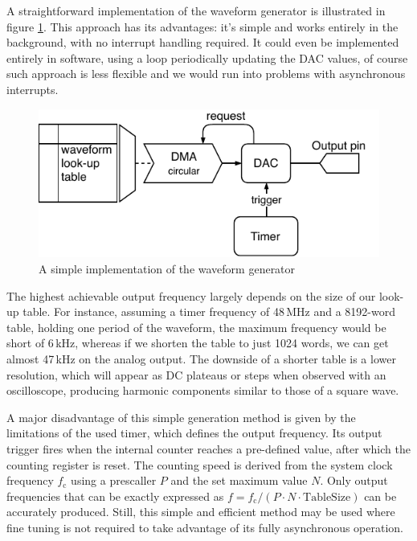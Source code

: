 A straightforward implementation of the waveform generator is illustrated in figure \ref{fig:wavegen-naive}. This approach has its advantages: it's simple and works entirely in the background, with no interrupt handling required. It could even be implemented entirely in software, using a loop periodically updating the DAC values, of course such approach is less flexible and we would run into problems with asynchronous interrupts.

\begin{figure}
	\centering
	\includegraphics[scale=1] {img/wavegen-naive.pdf}
	\caption{\label{fig:wavegen-naive}A simple implementation of the waveform generator}
\end{figure}

The highest achievable output frequency largely depends on the size of our look-up table. For instance, assuming a timer frequency of 48\,MHz and a 8192-word table, holding one period of the waveform, the maximum frequency would be short of 6\,kHz, whereas if we shorten the table to just 1024 words, we can get almost 47\,kHz on the analog output. The downside of a shorter table is a lower resolution, which will appear as DC plateaus or steps when observed with an oscilloscope, producing harmonic components similar to those of a square wave.

A major disadvantage of this simple generation method is given by the limitations of the used timer, which defines the output frequency. Its output trigger fires when the internal counter reaches a pre-defined value, after which the counting register is reset. The counting speed is derived from the system clock frequency $f_\mathrm{c}$ using a prescaller $P$ and the set maximum value $N$. Only output frequencies that can be exactly expressed as $f=f_\mathrm{c}/(P\cdot N \cdot \mathrm{TableSize})$ can be accurately produced. Still, this simple and efficient method may be used where fine tuning is not required to take advantage of its fully asynchronous operation.

